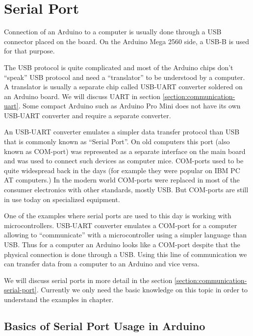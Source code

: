 \documentclass[../sparc.tex]{subfiles}
\begin{document}
\section{Serial Port}
\label{section:serial-port}

Connection of an Arduino to a computer is usually done through a USB connector
placed on the board.  On the Arduino Mega 2560 side, a USB-B is used for that
purpose.

The USB protocol is quite complicated and most of the Arduino chips don't
``speak'' USB protocol and need a ``translator'' to be understood by a computer.
A translator is usually a separate chip called USB-UART converter soldered on an
Arduino board.  We will discuss UART in section
\ref{section:communication-uart}.  Some compact Arduino such as Arduino Pro Mini
does not have its own USB-UART converter and require a separate converter.

An USB-UART converter emulates a simpler data transfer protocol than USB that is
commonly known as ``Serial Port''.  On old computers this port (also known as
COM-port) was represented as a separate interface on the main board and was used
to connect such devices as computer mice.  COM-ports used to be quite widespread
back in the days (for example they were popular on IBM PC AT computers.)  In the
modern world COM-ports were replaced in most of the consumer electronics with
other standards, mostly USB.  But COM-ports are still in use today on
specialized equipment.

One of the examples where serial ports are used to this day is working with
microcontrollers.  USB-UART converter emulates a COM-port for a computer
allowing to ``communicate'' with a microcontroller using a simpler language than
USB.  Thus for a computer an Arduino looks like a COM-port despite that the
physical connection is done through a USB.  Using this line of communication we
can transfer data from a computer to an Arduino and vice versa.

We will discuss serial ports in more detail in the section
\ref{section:communication-serial-port}.  Currently we only need the basic
knowledge on this topic in order to understand the examples in chapter.

\subsection{Basics of Serial Port Usage in Arduino}
\end{document}
